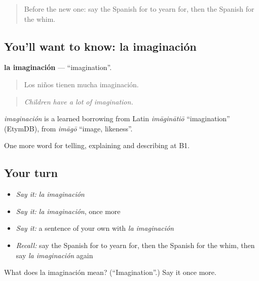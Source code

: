 \begin{quote}
Before the new one: say the Spanish for to yearn for, then the Spanish for the whim.
\end{quote}

\subsection*{You'll want to know: la imaginación}
\textbf{la imaginación} — \textquotedblleft{}imagination\textquotedblright{}.

\begin{quote}
Los niños tienen mucha imaginación.
\end{quote}

\begin{quote}
\emph{Children have a lot of imagination.}
\end{quote}

\begin{cousinweb}
\emph{imaginación} is a learned borrowing from Latin \emph{imāginātiō} \textquotedblleft{}imagination\textquotedblright{} (EtymDB), from \emph{imāgō} \textquotedblleft{}image, likeness\textquotedblright{}.
\end{cousinweb}

\begin{grammarlens}[title={What you've built}]
One more word for telling, explaining and describing at B1.
\end{grammarlens}

\subsection*{Your turn}
\begin{itemize}
\raggedright
  \item \emph{Say it:} \emph{la imaginación}
  \item \emph{Say it:} \emph{la imaginación}, once more
  \item \emph{Say it:} a sentence of your own with \emph{la imaginación}
  \item \emph{Recall:} say the Spanish for to yearn for, then the Spanish for the whim, then say \emph{la imaginación} again
\end{itemize}

\begin{tcolorbox}[breakable,colback=teal!4,colframe=teal!35!black,title={Before you move on}]
What does la imaginación mean? (\textquotedblleft{}Imagination\textquotedblright{}.) Say it once more.
\end{tcolorbox}

